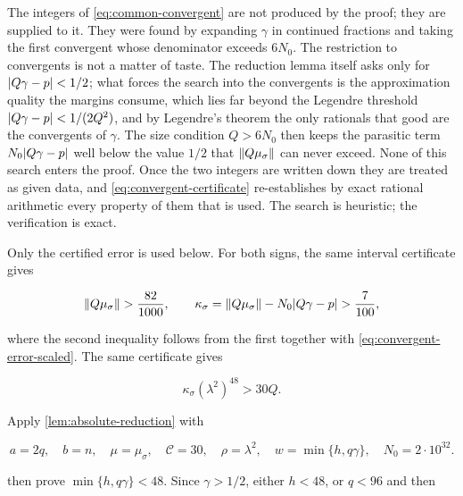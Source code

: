 \begin{remark}
\label{rem:convergent-provenance}
The integers of \cref{eq:common-convergent} are not produced by the proof; they
are supplied to it. They were found by expanding $\gamma$ in continued
fractions and taking the first convergent whose denominator exceeds $6N_0$.
The restriction to convergents is not a matter of taste. The reduction lemma
itself asks only for $\lvert Q\gamma-p\rvert<1/2$; what forces the search into the
convergents is the approximation quality the margins consume, which lies far
beyond the Legendre threshold $\lvert Q\gamma-p\rvert<1/(2Q^2)$, and by Legendre's
theorem the only rationals that good are the convergents of $\gamma$. The size
condition $Q>6N_0$ then keeps the parasitic term $N_0\lvert Q\gamma-p\rvert$ well
below the value $1/2$ that $\left\lVert Q\mu_\sigma\right\rVert$ can never exceed. None of this
search enters the proof. Once the two integers are written down they are
treated as given data, and \cref{eq:convergent-certificate} re-establishes by
exact rational arithmetic every property of them that is used. The search is
heuristic; the verification is exact.
\end{remark}

Only the certified error is used below. For both signs, the same interval
certificate gives

\begin{equation}
 \left\lVert Q\mu_\sigma\right\rVert>\frac{82}{1000},
 \qquad
 \kappa_\sigma
 =\left\lVert Q\mu_\sigma\right\rVert-N_0\lvert Q\gamma-p\rvert>\frac7{100},
 \label{eq:fixed-eta}
\end{equation}

where the second inequality follows from the first together with
\cref{eq:convergent-error-scaled}. The same certificate gives

\begin{equation}
 \kappa_\sigma(\lambda^2)^{48}>30Q.
 \label{eq:fixed-cutoff}
\end{equation}

Apply \cref{lem:absolute-reduction} with

\begin{equation}
 a=2q,\quad b=n,\quad \mu=\mu_\sigma,\quad
 \mathcal C=30,\quad \rho=\lambda^2,\quad
 w=\min\{h,q\gamma\},\quad N_0=2\mathbin{\cdot}10^{32}.
\end{equation}

then prove $\min\{h,q\gamma\}<48$. Since $\gamma>1/2$, either $h<48$,
or $q<96$ and then

